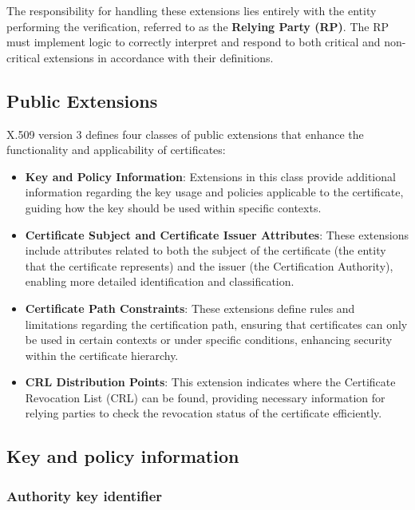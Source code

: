 The responsibility for handling these extensions lies entirely with
the entity performing the verification, referred to as the
\textbf{Relying Party (RP)}. The RP must implement logic to correctly
interpret and respond to both critical and non-critical extensions in
accordance with their definitions.

\subsection{Public Extensions}

X.509 version 3 defines four classes of public extensions that enhance
the functionality and applicability of certificates:

\begin{itemize}
  \item \textbf{Key and Policy Information}: Extensions in this
    class provide additional information regarding the key usage and
    policies applicable to the certificate, guiding how the key
    should be used within specific contexts.

  \item \textbf{Certificate Subject and Certificate Issuer
    Attributes}: These extensions include attributes related to both
    the subject of the certificate (the entity that the certificate
    represents) and the issuer (the Certification Authority),
    enabling more detailed identification and classification.

  \item \textbf{Certificate Path Constraints}: These extensions
    define rules and limitations regarding the certification path,
    ensuring that certificates can only be used in certain contexts
    or under specific conditions, enhancing security within the
    certificate hierarchy.

  \item \textbf{CRL Distribution Points}: This extension indicates
    where the Certificate Revocation List (CRL) can be found,
    providing necessary information for relying parties to check the
    revocation status of the certificate efficiently.
\end{itemize}

\subsection{Key and policy information}

\subsubsection{Authority key identifier}

